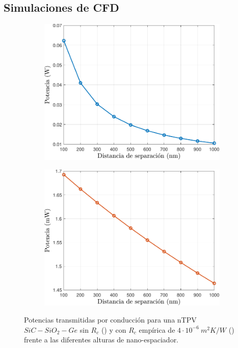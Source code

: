 \subsection{Simulaciones de CFD}
\graphicspath{ {./figuras/Resultados/conduccion/pdf/} }
\begin{figure}[H]
	\centering
	\begin{subfigure}[b]{0.49\textwidth}
		\centering
			\includegraphics[width=1.00\textwidth]{Pn_SiCSiO2Ge.pdf}
		\caption{ }
		\label{fig:Prc_SiCSiO2Ge}
	\end{subfigure}
	\hfill
	\begin{subfigure}[b]{0.49\textwidth}
		\centering
			\includegraphics[width=1.00\textwidth]{Prc_SiCSiO2Ge.pdf}
		\caption{ }
		\label{fig:relPrc_SiCSiO2Ge}
	\end{subfigure}
	\caption{Potencias transmitidas por conducción para una nTPV $SiC-SiO_2-Ge$ sin $R_c$ () y con $R_c$ empírica de $4\cdot 10^{-6} \ m^2 K/W$ () frente a las diferentes alturas de nano-espaciador.}
	\label{fig:PrcCond_SiCSiO2Ge}
\end{figure}
